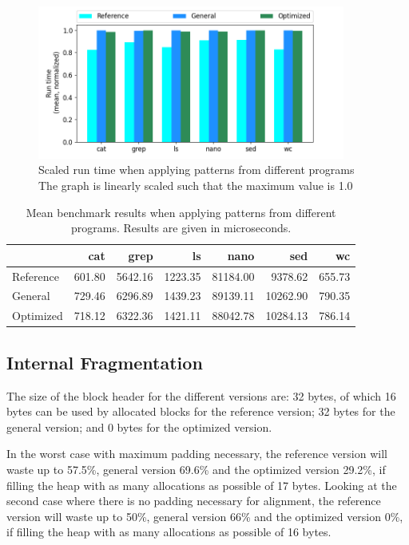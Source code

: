 \begin{figure}[H]
    \centering
    \includegraphics[width=0.90\textwidth]{figures/program_benchmark.png}
    \caption{Scaled run time when applying patterns from different programs The graph is linearly scaled such that the maximum value is 1.0}
    \label{fig:program_benchmarks}
\end{figure}

\begin{table}[H]
    \centering
    \begin{tabular}{lrrrrrr}
    {} & {cat} & {grep} & {ls} & {nano} & {sed} & {wc} \\
    \midrule
    Reference & 601.80 & 5642.16 & 1223.35 & 81184.00 & 9378.62 & 655.73 \\
    General & 729.46 & 6296.89 & 1439.23 & 89139.11 & 10262.90 & 790.35 \\
    Optimized & 718.12 & 6322.36 & 1421.11 & 88042.78 & 10284.13 & 786.14 \\
    \end{tabular}
    \caption{Mean benchmark results when applying patterns from different programs. Results are given in microseconds.}
    \label{table:program_benchmarks}
\end{table}

\subsection{Internal Fragmentation}

The size of the block header for the different versions are: 32 bytes, of which 16 bytes can be used by allocated blocks for the reference version; 32 bytes for the general version; and 0 bytes for the optimized version. 

In the worst case with maximum padding necessary, the reference version will waste up to 57.5\%, general version 69.6\% and the optimized version 29.2\%, if filling the heap with as many allocations as possible of 17 bytes. Looking at the second case where there is no padding necessary for alignment, the reference version will waste up to 50\%, general version 66\% and the optimized version 0\%, if filling the heap with as many allocations as possible of 16 bytes.

